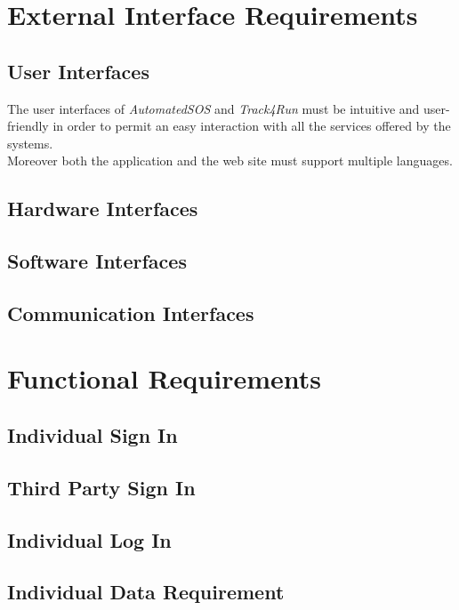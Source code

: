 \section{External Interface Requirements}

\subsection{User Interfaces}
The user interfaces of \textit{AutomatedSOS} and \textit{Track4Run} must be intuitive and user-friendly in order to permit an easy interaction with all the services offered by the systems.\\
Moreover both the application and the web site must support multiple languages.

\subsection{Hardware Interfaces}

\subsection{Software Interfaces}

\subsection{Communication Interfaces}

\clearpage
\section{Functional Requirements}

\subsection{Individual Sign In}

\clearpage

\subsection{Third Party Sign In}

\clearpage

\subsection{Individual Log In}

\clearpage

\subsection{Individual Data Requirement}

\clearpage

